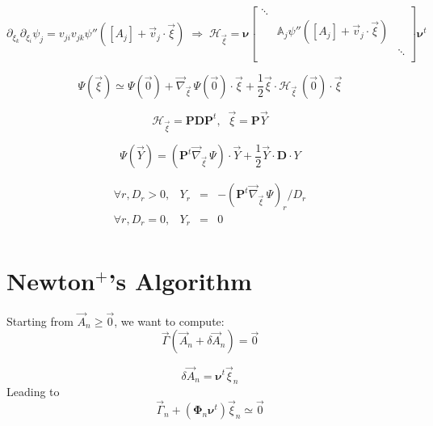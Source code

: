\documentclass[aps,onecolumn,11pt]{revtex4}
\begin{document}
\begin{equation}
	\partial_{\xi_k}\partial_{\xi_i}\psi_j = v_{ji} v_{jk}\psi''( [A_j] + \vec{v}_j \cdot \vec{\xi} )  
 \; \Rightarrow \;
	\mathcal{H}_{\vec{\xi}}   =  \bm{\nu}
	\begin{bmatrix}
	\ddots & & \\
	  & \mathbb{A}_j \psi''( [A_j] + \vec{v}_j \cdot \vec{\xi} ) & \\
	  & & \ddots\\
	\end{bmatrix}
	\bm{\nu}^t
\end{equation}

\begin{equation}
\Psi(\vec{\xi}) \simeq \Psi(\vec{0}) + \vec{\nabla}_{\vec{\xi}}\, \Psi(\vec{0}) \cdot \vec{\xi} + \dfrac{1}{2} \vec{\xi} \cdot \mathcal{H}_{\vec{\xi}} \ (\vec{0}) \cdot \vec{\xi}
\end{equation}

\begin{equation}
	 \mathcal{H}_{\vec{\xi}} = \bm{P} \bm{D} \bm{P}^t, \;\; \vec{\xi} = \bm{P} \vec{Y}
\end{equation}

\begin{equation}
	\Psi(\vec{Y}) = (\bm{P}^t \vec{\nabla}_{\vec{\xi}}\, \Psi) \cdot \vec{Y} + \dfrac{1}{2} \vec{Y} \cdot \bm{D} \cdot{Y}
\end{equation}

\begin{equation}
\begin{array}{rrcl}
	\forall r, D_r > 0, & Y_r & = &-(\bm{P}^t \vec{\nabla}_{\vec{\xi}}\, \Psi)_r / D_r\\
 	\forall r, D_r = 0, & Y_r & = &0 \\
\end{array}
\end{equation}


   
\section{Newton$^+$'s Algorithm}

Starting from $\vec{A}_n\geq\vec{0}$, we want to compute:
\begin{equation}
	\vec{\Gamma}(\vec{A}_n+\delta\vec{A}_n) = \vec{0}
\end{equation}
	
\begin{equation}
	\delta\vec{A}_n = \bm{\nu}^t \vec{\xi}_n
\end{equation}
Leading to
\begin{equation}
	\vec{\Gamma}_n + (\bm{\Phi}_n \bm{\nu}^t ) \vec{\xi}_n \simeq \vec{0}
\end{equation}
 
\end{document}
